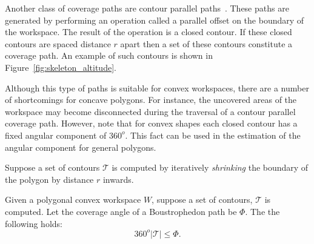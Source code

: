 \documentclass[../main.tex]{subfiles}
\begin{document}

\begin{remark}
Another class of coverage paths are contour parallel paths~\cite{held1994pocket}. These paths are generated by performing an operation called a parallel offset on the boundary of the workspace. The result of the operation is a closed contour. If these closed contours are spaced distance $r$ apart then a set of these contours constitute a coverage path. An example of such contours is shown in Figure~\ref{fig:skeleton_altitude}.

Although this type of paths is suitable for convex workspaces, there are a number of shortcomings for concave polygons. For instance, the uncovered areas of the workspace may become disconnected during the traversal of a contour parallel coverage path. However, note that for convex shapes each closed contour has a fixed angular component of $360^o$. This fact can be used in the estimation of the angular component for general polygons.
\end{remark}

Suppose a set of contours $\mathcal{T}$ is computed by iteratively \emph{shrinking} the boundary of the polygon by distance $r$ inwards.
\begin{proposition}
	Given a polygonal convex workspace $W$, suppose a set of contours, $\mathcal{T}$ is computed. Let the coverage angle of a Boustrophedon path be $\Phi$. The the following holds:
	\begin{equation}
		360^o|\mathcal{T}|\leq\Phi.
	\end{equation}
\end{proposition}
\end{document}
